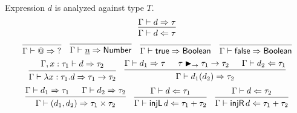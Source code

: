 \documentclass{article}
\newcommand{\entails}{\mathrel{\mathop{\vdash}}}
\newcommand{\synth}{\mathrel{\mathop{\Rightarrow}}}
\newcommand{\analyze}{\mathrel{\mathop{\Leftarrow}}}
\newcommand{\ctype}[1]{\mathsf{#1}}
\newcommand{\inl}{\operatorname{\mathsf{injL}}}
\newcommand{\inr}{\operatorname{\mathsf{injR}}}
\newcommand{\MatchArrow}{\mathrel{\mathop{\blacktriangleright_{\rightarrow}}}}
\begin{document}
\begin{enumerate}
    \fbox{\(\Gamma \entails d \analyze T\)} Expression \(d\) is analyzed
    against type \(T\).
    \[
      \begin{prooftree}
        \hypo{\Gamma \entails d \synth \tau}
        \infer1[]{\Gamma \entails d \analyze \tau}
      \end{prooftree}
    \]
    \[
      \begin{prooftree}
        \infer0[]{\Gamma \entails @ \synth \ctype{?}}
      \end{prooftree}
      \quad
      \begin{prooftree}
        \infer0[]{\Gamma \entails \underline{n} \synth \ctype{Number}}
      \end{prooftree}
      \quad
      \begin{prooftree}
        \infer0[]{\Gamma \entails \mathsf{true} \synth \ctype{Boolean}}
      \end{prooftree}
      \quad
      \begin{prooftree}
        \infer0[]{\Gamma \entails \mathsf{false} \synth \ctype{Boolean}}
      \end{prooftree}
    \]
    \[
      \begin{prooftree}
        \hypo{\Gamma, x : \tau_1 \entails d \synth \tau_2}
        \infer1[]{\Gamma \entails \lambda x : \tau_1 . d \synth \tau_1 \to \tau_2}
      \end{prooftree}
      \quad
      \begin{prooftree}
        \hypo{\Gamma \entails d_1 \synth \tau}
        \hypo{\tau \MatchArrow \tau_1 \to \tau_2}
        \hypo{\Gamma \entails d_2 \analyze \tau_1}
        \infer3[]{\Gamma \entails d_1(d_2) \synth \tau_2}
      \end{prooftree}
    \]
    \[
      \begin{prooftree}
        \hypo{\Gamma \entails d_1 \synth \tau_1}
        \hypo{\Gamma \entails d_2 \synth \tau_2}
        \infer2[]{\Gamma \entails (d_1, d_2) \synth \tau_1 \times \tau_2}
      \end{prooftree}
      \quad
      \begin{prooftree}
        \hypo{\Gamma \entails d \analyze \tau_1}
        \infer1[]{\Gamma \entails \inl d \analyze \tau_1 + \tau_2}
      \end{prooftree}
      \quad
      \begin{prooftree}
        \hypo{\Gamma \entails d \analyze \tau_2}
        \infer1[]{\Gamma \entails \inr d \analyze \tau_1 + \tau_2}
      \end{prooftree}
    \]

\end{enumerate}
\end{document}
